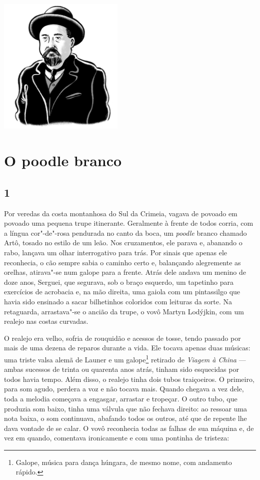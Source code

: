 \pagebreak
\thispagestyle{empty}
\mbox{}
\vfill
\begin{center}
\includegraphics[width=6cm]{./imgs/autor9.jpg}
\end{center}

\chapter{O poodle branco}


\section{1}

\noindent{}Por veredas da costa montanhosa do Sul da Crimeia, vagava de povoado em
povoado uma pequena trupe itinerante. Geralmente à frente de todos
corria, com a língua cor"-de"-rosa pendurada no canto da boca, um
\emph{poodle} branco chamado Artô, tosado no estilo de um leão. Nos
cruzamentos, ele parava e, abanando o rabo, lançava um olhar
interrogativo para trás. Por sinais que apenas ele reconhecia, o cão
sempre sabia o caminho certo e, balançando alegremente as orelhas,
atirava"-se num galope para a frente. Atrás dele andava um menino de doze
anos, Serguei, que segurava, sob o braço esquerdo, um tapetinho para
exercícios de acrobacia e, na mão direita, uma gaiola com um pintassilgo
que havia sido ensinado a sacar bilhetinhos coloridos com leituras da
sorte. Na retaguarda, arrastava"-se o ancião da trupe, o vovô Martyn
Lodýjkin, com um realejo nas costas curvadas.

O realejo era velho, sofria de rouquidão e acessos de tosse, tendo
passado por mais de uma dezena de reparos durante a vida. Ele tocava
apenas duas músicas: uma triste valsa alemã de Launer e um
galope\footnote{Galope, música para dança húngara, de mesmo nome, com
  andamento rápido.} retirado de \emph{Viagem à China} --- ambas
sucessos de trinta ou quarenta anos atrás, tinham sido esquecidas por
todos havia tempo. Além disso, o realejo tinha dois tubos traiçoeiros. O
primeiro, para som agudo, perdera a voz e não tocava mais. Quando
chegava a vez dele, toda a melodia começava a engasgar, arrastar e
tropeçar. O outro tubo, que produzia som baixo, tinha uma válvula que
não fechava direito: ao ressoar uma nota baixa, o som continuava,
abafando todos os outros, até que de repente lhe dava vontade de se
calar. O vovô reconhecia todas as falhas de sua máquina e, de vez em
quando, comentava ironicamente e com uma pontinha de tristeza:

